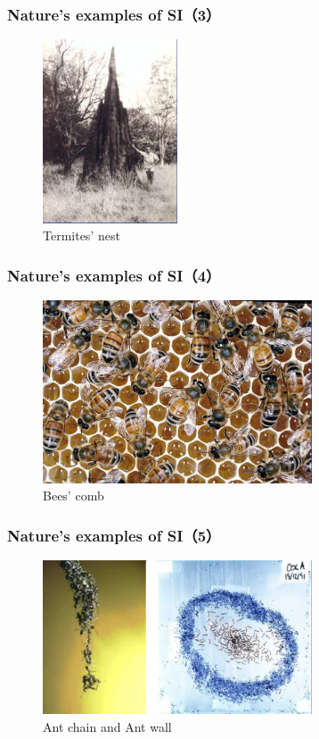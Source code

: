 \begin{frame}
  \frametitle{Nature’s examples of SI（3）}
    \begin{figure}[htbp]
      \centering
      \includegraphics[width=4cm]{pic/si3.png}
      \caption{Termites’ nest}
    \end{figure}
\end{frame}

\begin{frame}
  \frametitle{Nature’s examples of SI（4）}
    \begin{figure}[htbp]
      \centering
      \includegraphics[width=8cm]{pic/si4.png}
      \caption{Bees’ comb}
    \end{figure}
\end{frame}

\begin{frame}
  \frametitle{Nature’s examples of SI（5）}
    \begin{figure}[htbp]
      \centering
      \includegraphics[width=8cm]{pic/si5.png}
      \caption{Ant chain and Ant wall}
    \end{figure}
\end{frame}


